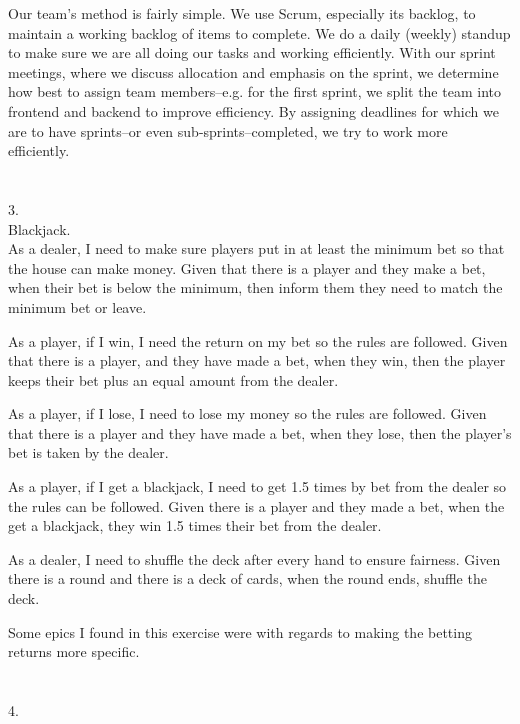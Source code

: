 \documentclass[12pt, a4paper]{article}
\begin{document}
Our team's method is fairly simple.  We use Scrum, especially its backlog, to maintain a working backlog of items to complete. We do a daily (weekly) standup to make sure we are all doing our tasks and working efficiently.  With our sprint meetings, where we discuss allocation and emphasis on the sprint, we determine how best to assign team members--e.g. for the first sprint, we split the team into frontend and backend to improve efficiency.
By assigning deadlines for which we are to have sprints--or even sub-sprints--completed, we try to work more efficiently.  \\ \\ \\

3.\\
Blackjack.\\

As a dealer, I need to make sure players put in at least the minimum bet so that the house can make money.
Given that there is a player and they make a bet, when their bet is below the minimum, then inform them they need to match the minimum bet or leave.

As a player, if I win, I need the return on my bet so the rules are followed.
Given that there is a player, and they have made a bet, when they win, then the player keeps their bet plus an equal amount from the dealer.

As a player, if I lose, I need to lose my money so the rules are followed.
Given that there is a player and they have made a bet, when they lose, then the player's bet is taken by the dealer.

As a player, if I get a blackjack, I need to get 1.5 times by bet from the dealer so the rules can be followed.
Given there is a player and they made a bet, when the get a blackjack, they win 1.5 times their bet from the dealer.

As a dealer, I need to shuffle the deck after every hand to ensure fairness.
Given there is a round and there is a deck of cards, when the round ends, shuffle the deck.

Some epics I found in this exercise were with regards to making the betting returns more specific.\\ \\ \\

4.
\end{document}
